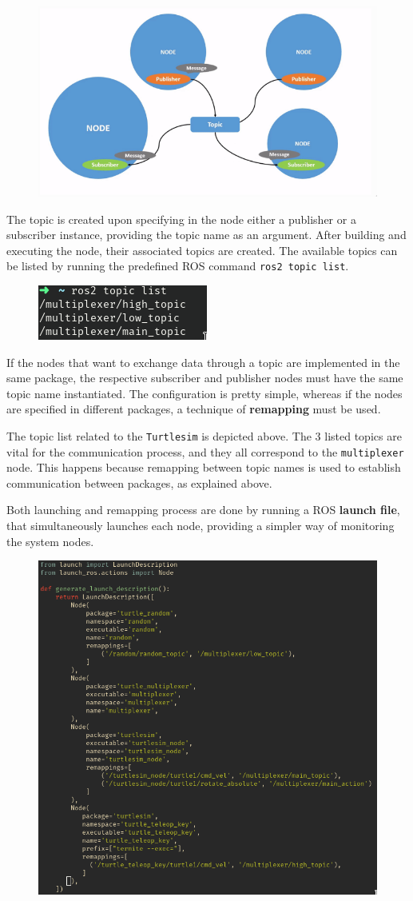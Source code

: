 \begin{figure}[H]
        \centering
        \includegraphics[width=0.7\linewidth]{images/ros2-topics.png}
\end{figure}
            
The topic is created upon specifying in the node either a publisher or a subscriber instance, providing the topic name as an argument. After building and executing the node, their associated topics are created. The available topics can be listed by running the predefined ROS command \texttt{ros2 topic list}.
            
\begin{figure}[H]
        \centering
         \includegraphics[width=0.3\linewidth]{images/ts_topiclist.png}
\end{figure}
            
If the nodes that want to exchange data through a topic are implemented in the same package, the respective subscriber and publisher nodes must have the same topic name instantiated. The configuration is pretty simple, whereas if the nodes are specified in different packages, a technique of \textbf{remapping} must be used.

The topic list related to the \texttt{Turtlesim} is depicted above. The 3 listed topics are vital for the communication process, and they all correspond to the \texttt{multiplexer} node. This happens because remapping between topic names is used to establish communication between packages, as explained above.

Both launching and remapping process are done by running a ROS \textbf{launch file}, that simultaneously launches each node, providing a simpler way of monitoring the system nodes. 

\begin{figure}[H]
        \centering
         \includegraphics[width=0.3\linewidth]{images/ts_launch_file.png}
\end{figure}

